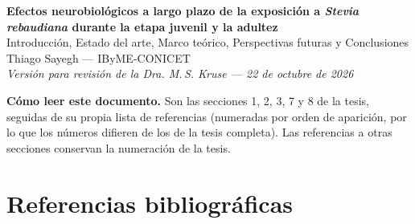 \documentclass[12pt,a4paper,oneside]{report}
\begin{document}

\begin{center}
  {\Large\textbf{Efectos neurobiológicos a largo plazo de la exposición a \textit{Stevia rebaudiana} durante la etapa juvenil y la adultez}}\\[0.8em]
  {\large Introducción, Estado del arte, Marco teórico, Perspectivas futuras y Conclusiones}\\[0.6em]
  Thiago Sayegh --- IByME-CONICET\\[0.3em]
  \textit{Versión para revisión de la Dra. M.\,S. Kruse --- 22 de octubre de 2026}
\end{center}

\vspace{0.8em}
\noindent\textbf{Cómo leer este documento.} Son las secciones 1, 2, 3, 7 y 8 de la tesis, seguidas de su propia lista de referencias (numeradas por orden de aparición, por lo que los números difieren de los de la tesis completa). Las referencias a otras secciones conservan la numeración de la tesis.

\clearpage
\setcounter{chapter}{0}



\setcounter{chapter}{6}



\chapter*{Referencias bibliográficas}
\printbibliography[heading=none]
\end{document}
